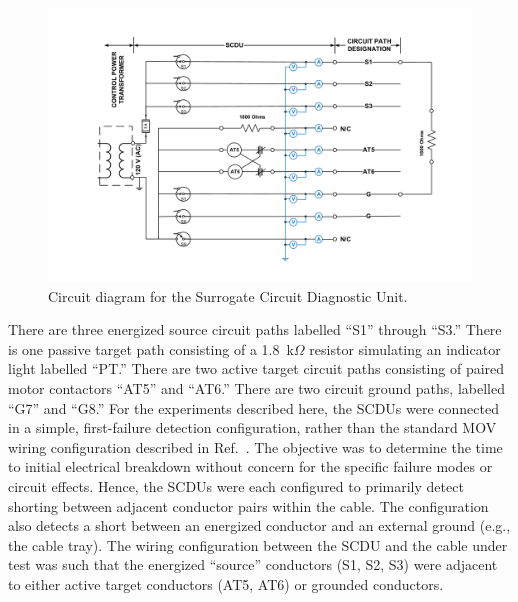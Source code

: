 \begin{figure}[ht]
\includegraphics[width=6.5in]{../FIGURES/Circuit_Drawing}
\caption[Circuit diagram for the Surrogate Circuit Diagnostic Unit]{Circuit diagram for the Surrogate Circuit Diagnostic Unit.}
\label{circuit_diagram}
\end{figure}

There are three energized source circuit paths labelled ``S1'' through ``S3.''  There is one passive target path consisting of a 1.8~k$\Omega$ resistor simulating an indicator light labelled ``PT.'' There are two active target circuit paths consisting of paired motor contactors ``AT5'' and ``AT6.'' There are two circuit ground paths, labelled ``G7'' and ``G8.'' For the experiments described here, the SCDUs were connected in a simple, first-failure detection configuration, rather than the standard MOV wiring configuration described in Ref.~\cite{CAROLFIRE}.  The objective was to determine the time to initial electrical breakdown without concern for the specific failure modes or circuit effects. Hence, the SCDUs were each configured to primarily detect shorting between adjacent conductor pairs within the cable.  The configuration also detects a short between an energized conductor and an external ground (e.g., the cable tray). The wiring configuration between the SCDU and the cable under test was such that the energized ``source'' conductors (S1, S2, S3) were adjacent to either active target conductors (AT5, AT6) or grounded conductors.

